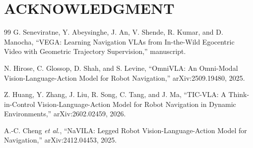 \documentclass[letterpaper, 10 pt, conference]{ieeeconf}  %
\newif\ifincludesupplementary
\begin{document}
\section*{ACKNOWLEDGMENT}





\begin{thebibliography}{99}
    G. Seneviratne, Y. Abeysinghe, J. An, V. Shende, R. Kumar, and
    D. Manocha, ``VEGA: Learning Navigation VLAs from In-the-Wild
    Egocentric Video with Geometric Trajectory Supervision,'' manuscript.

    N. Hirose, C. Glossop, D. Shah, and S. Levine,
    ``OmniVLA: An Omni-Modal Vision-Language-Action Model for Robot
    Navigation,'' arXiv:2509.19480, 2025.

    Z. Huang, Y. Zhang, J. Liu, R. Song, C. Tang, and J. Ma,
    ``TIC-VLA: A Think-in-Control Vision-Language-Action Model for Robot
    Navigation in Dynamic Environments,'' arXiv:2602.02459, 2026.

    A.-C. Cheng \emph{et al.}, ``NaVILA: Legged Robot
    Vision-Language-Action Model for Navigation,'' arXiv:2412.04453, 2025.

\end{thebibliography}




\ifincludesupplementary
  \clearpage
  \nobalance
  \onecolumn
  
\fi
\end{document}
